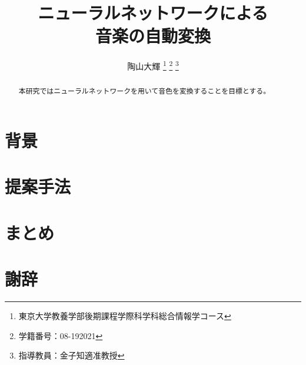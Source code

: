 \documentclass[dvipdfmx]{jreport}
\title{ニューラルネットワークによる\\ 音楽の自動変換}
\author{陶山大輝 \thanks{東京大学教養学部後期課程学際科学科総合情報学コース} \thanks{学籍番号：08-192021} \thanks{指導教員：金子知適准教授}}
\begin{document}
\maketitle


\begin{abstract}
本研究ではニューラルネットワークを用いて音色を変換することを目標とする。
\end{abstract}

\tableofcontents





\chapter{背景}



\chapter{提案手法}


\chapter{まとめ}


\chapter*{謝辞}




\end{document}
